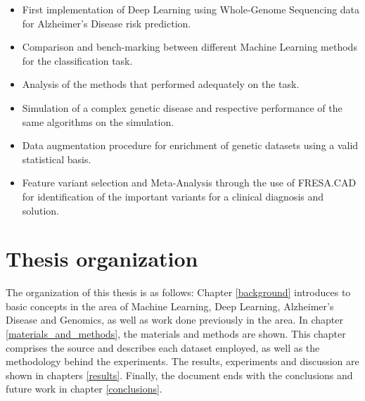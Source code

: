 \begin{itemize}
	\item First implementation of Deep Learning using Whole-Genome Sequencing data for Alzheimer's Disease risk prediction.
	\item Comparison and bench-marking between different Machine Learning methods for the classification task.
	\item Analysis of the methods that performed adequately on the task.
	\item Simulation of a complex genetic disease and respective performance of the same algorithms on the simulation.
    \item Data augmentation procedure for enrichment of genetic datasets using a valid statistical basis.
    \item Feature variant selection and Meta-Analysis through the use of FRESA.CAD for identification of the important variants for a clinical diagnosis and solution.
    
\end{itemize}


\section{Thesis organization}

The organization of this thesis is as follows: Chapter \ref{background} introduces to basic concepts in the area of Machine Learning, Deep Learning, Alzheimer's Disease and Genomics, as well as work done previously in the area. In chapter \ref{materials_and_methods}, the materials and methods are shown. This chapter comprises the source and describes each dataset employed, as well as the methodology behind the experiments. The results, experiments and  discussion are shown in chapters \ref{results}. Finally, the document ends with the conclusions and future work in chapter \ref{conclusions}.








